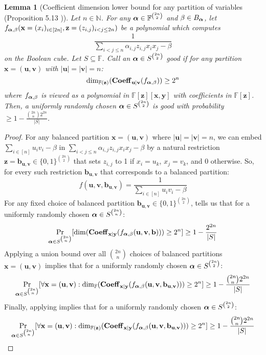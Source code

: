 \documentclass[11pt]{article}
\newtheorem{lemma}[theorem]{Lemma}
\newcommand{\Boo}{\{0,1 \}}
\newcommand{\F}{\mathbb{F}}
\begin{document}
\begin{lemma}[Coefficient dimension lower bound for any partition of variables (Proposition 5.13 \cite{FSTW21})]\label{lem: coeff dim any partition}
    Let $n\in \mathbb{N}$. For any $\bfalpha \in \F^{\binom{2n}{2}}$ and $\beta \in B_{\boldsymbol{\alpha}}$, let $f_{\boldsymbol{\alpha},\beta}(\mathbf{x}=(x_i)_{i\in[2n]},\mathbf{z}=(z_{i,j})_{i<j\leq 2n})$ be a polynomial which computes $$\frac{1}{\sum_{i<j\leq n}\alpha_{i,j}z_{i,j}x_ix_j - \beta}$$ on the Boolean cube. Let $S\subseteq \F$. Call an $\boldsymbol{\alpha} \in S^{\binom{2n}{2}}$ \emph{good} if for any partition $\mathbf{x} = (\mathbf{u},\mathbf{v})$ with $|\mathbf{u}|=|\mathbf{v}| = n$: $$ \dim_{\F(\mathbf{z})}(\bfCoeff_{\mathbf{u}|\mathbf{v}}(f_{\bfalpha,\beta})) \geq 2^n$$
    where $f_{\boldsymbol{\alpha},\beta}$ is viewed as a polynomial in $\F[\mathbf{z}][\mathbf{x},\mathbf{y}]$ with coefficients in $\F[\mathbf{z}]$. \\
    Then, a uniformly randomly chosen $\boldsymbol{\alpha} \in S^{\binom{2n}{2}}$ is good with probability $\geq 1 - \frac{\binom{2n}{n}2^{2n}}{|S|}$.
\end{lemma}
\begin{proof}
    For any balanced partition $\mathbf{x} = (\mathbf{u},\mathbf{v})$ where $|\mathbf{u}| = |\mathbf{v}| = n$, we can embed $\sum_{i\in [n]}u_iv_i - \beta$ in $\sum_{i<j\leq n}\alpha_{i,j}z_{i,j}x_ix_j - \beta$ by a natural restriction $\mathbf{z} = \mathbf{b}_{\mathbf{u},\mathbf{v}} \in \Boo^{\binom{2n}{2}}$ that sets $z_{i,j}$ to 1 if $x_i = u_k$, $x_j = v_k$, and 0 otherwise. So, for every such restriction $\mathbf{b}_{\mathbf{u},\mathbf{v}}$ that corresponds to a balanced partition: $$f(\mathbf{u},\mathbf{v},\mathbf{b}_{\mathbf{u},\mathbf{v}}) = \frac{1}{\sum_{i\in[n]}u_iv_i - \beta}$$
    For any fixed choice of balanced partition $\mathbf{b_{\mathbf{u},\mathbf{v}}}\in\Boo^{\binom{2n}{2}}$,  tells us that for a uniformly randomly chosen $\boldsymbol{\alpha} \in S^{\binom{2n}{n}}$: $$ \Pr_{\boldsymbol{\alpha} \in S^{\binom{2n}{n}}}[\dim (\operatorname{\mathbf{Coeff}}_{\mathbf{x}|\mathbf{y}}(f_{\boldsymbol{\alpha},\beta}(\mathbf{u},\mathbf{v},\mathbf{b}))) \geq 2^n] \geq 1-\frac{2^{2n}}{|S|} $$
    Applying a union bound over all $\binom{2n}{n}$ choices of balanced partitions $\mathbf{x} = (\mathbf{u},\mathbf{v})$ implies that for a uniformly randomly chosen $\boldsymbol{\alpha} \in S^{\binom{2n}{2}}$: $$ \Pr_{\bfalpha \in S^{\binom{2n}{n}}}[\forall \mathbf{x} = (\mathbf{u},\mathbf{v}): \dim_{\F}(\bfCoeff_{\mathbf{x}|\mathbf{y}}(f_{\bfalpha,\beta}(\mathbf{u},\mathbf{v},\mathbf{b}_{\mathbf{u},\mathbf{v}}))) \geq 2^n] \geq 1-\frac{\binom{2n}{n}2^{2n}}{|S|} $$
    Finally, applying  implies that for a uniformly randomly chosen $\boldsymbol{\alpha} \in S^{\binom{2n}{2}}$:
    $$ \Pr_{\bfalpha \in S^{\binom{2n}{n}}}[\forall \mathbf{x} = (\mathbf{u},\mathbf{v}): \dim_{\F(\mathbf{z})}(\bfCoeff_{\mathbf{x}|\mathbf{y}}(f_{\bfalpha,\beta}(\mathbf{u},\mathbf{v},\mathbf{b}_{\mathbf{u},\mathbf{v}}))) \geq 2^n] \geq 1-\frac{\binom{2n}{n}2^{2n}}{|S|} $$
\end{proof}
\end{document}
